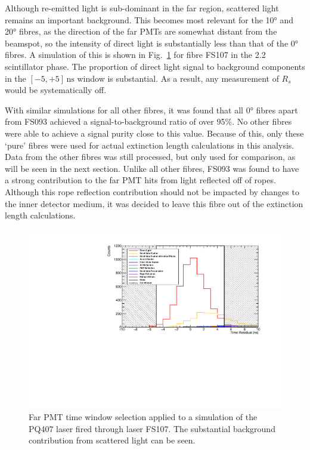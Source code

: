 Although re-emitted light is sub-dominant in the far region, scattered light remains an important background. This becomes most relevant for the \ang{10} and \ang{20} fibres, as the direction of the far PMTs are somewhat distant from the beamspot, so the intensity of direct light is substantially less than that of the \ang{0} fibres. A simulation of this is shown in Fig.~\ref{fig:smellie_PQ407_FS107_far_pmts_components} for fibre FS107 in the \SI{2.2}{\gpl} scintillator phase. The proportion of direct light signal to background components in the $[-5,+5]\,\si{\ns}$ window is substantial. As a result, any measurement of $R_{s}$ would be systematically off. %

With similar simulations for all other fibres, it was found that all \ang{0} fibres apart from FS093 achieved a signal-to-background ratio of over 95\%. No other fibres were able to achieve a signal purity close to this value. Because of this, only these `pure' fibres were used for actual extinction length calculations in this analysis. Data from the other fibres was still processed, but only used for comparison, as will be seen in the next section. Unlike all other fibres, FS093 was found to have a strong contribution to the far PMT hits from light reflected off of ropes. Although this rope reflection contribution should not be impacted by changes to the inner detector medium, it was decided to leave this fibre out of the extinction length calculations.

\begin{figure}
    \centering
    \includegraphics[width=\textwidth]{5_SMELLIEAnalysis/images/far_pmts_tres_components_nice_PQ407_FS107.pdf}
    \caption[Far PMT time window selection applied to a simulation of the PQ407 laser fired through laser FS107]
    {Far PMT time window selection applied to a simulation of the PQ407 laser fired through laser FS107. The substantial background contribution from scattered light can be seen.}
    \label{fig:smellie_PQ407_FS107_far_pmts_components}
\end{figure}

